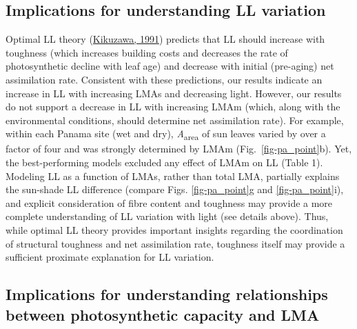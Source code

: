 \documentclass[
  12pt,
  letterpaper,
  DIV=11,
  numbers=noendperiod]{scrartcl}
\begin{document}
\hypertarget{implications-for-understanding-ll-variation}{%
\subsection{Implications for understanding LL
variation}\label{implications-for-understanding-ll-variation}}

Optimal LL theory (\protect\hyperlink{ref-Kikuzawa1991}{Kikuzawa, 1991})
predicts that LL should increase with toughness (which increases
building costs and decreases the rate of photosynthetic decline with
leaf age) and decrease with initial (pre-aging) net assimilation rate.
Consistent with these predictions, our results indicate an increase in
LL with increasing LMAs and decreasing light. However, our results do
not support a decrease in LL with increasing LMAm (which, along with the
environmental conditions, should determine net assimilation rate). For
example, within each Panama site (wet and dry),
\emph{A}\textsubscript{area} of sun leaves varied by over a factor of
four and was strongly determined by LMAm (Fig.~\ref{fig-pa_point}b).
Yet, the best-performing models excluded any effect of LMAm on LL (Table
1). Modeling LL as a function of LMAs, rather than total LMA, partially
explains the sun-shade LL difference (compare Figs. \ref{fig-pa_point}g
and \ref{fig-pa_point}i), and explicit consideration of fibre content
and toughness may provide a more complete understanding of LL variation
with light (see details above). Thus, while optimal LL theory provides
important insights regarding the coordination of structural toughness
and net assimilation rate, toughness itself may provide a sufficient
proximate explanation for LL variation.

\hypertarget{implications-for-understanding-relationships-between-photosynthetic-capacity-and-lma}{%
\subsection{Implications for understanding relationships between
photosynthetic capacity and
LMA}\label{implications-for-understanding-relationships-between-photosynthetic-capacity-and-lma}}
\end{document}
